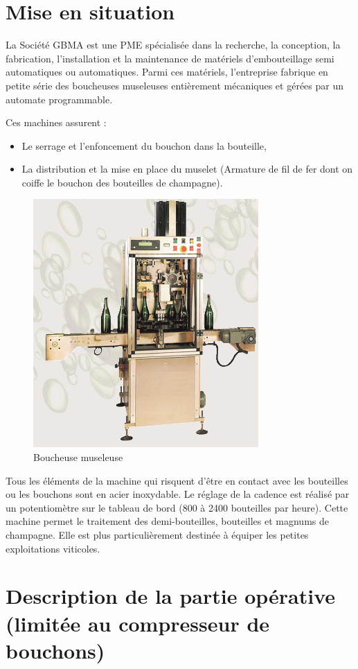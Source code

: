 

\section{Mise en situation}

La Société GBMA est une PME spécialisée dans la recherche, la conception, la fabrication, l'installation et la maintenance de matériels d'embouteillage semi automatiques ou automatiques. Parmi ces matériels, l'entreprise fabrique en petite série des boucheuses museleuses entièrement mécaniques et gérées par un automate programmable. 

Ces machines assurent :
\begin{itemize}
 \item Le serrage et l'enfoncement du bouchon dans la bouteille,
 \item La distribution et la mise en place du muselet (Armature de fil de fer dont on coiffe le bouchon des bouteilles de champagne).
\end{itemize}

\begin{figure}[!h]
\begin{center}
	\includegraphics[width=0.4\linewidth]{img/fig01}
\end{center}
\caption{Boucheuse museleuse}
\label{fig01}
\end{figure} 

Tous les éléments de la machine qui risquent d'être en contact avec les bouteilles ou les bouchons sont en acier inoxydable. Le réglage de la cadence est réalisé par un potentiomètre sur le tableau de bord (800 à 2400 bouteilles par heure). Cette machine permet le traitement des demi-bouteilles, bouteilles et magnums de champagne. Elle est plus particulièrement destinée à équiper les petites exploitations viticoles.

\section{Description de la partie opérative (limitée au compresseur de bouchons)}

